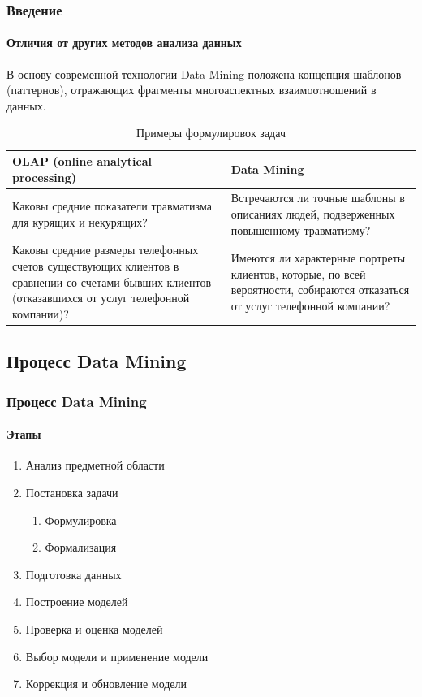 \documentclass[xcolor=table]{beamer}
\begin{document}
\begin{frame}
  \frametitle{Введение}
  \framesubtitle{Отличия от других методов анализа данных}
  В основу современной технологии Data Mining положена концепция шаблонов (паттернов), отражающих фрагменты многоаспектных взаимоотношений в данных.

  \vspace{-15pt}

  \begin{table}
    \caption{Примеры формулировок задач}
    \vspace{-10pt}
    \begin{tabular}{|p{}|p{}|}
      \hline
      \cellcolor{cell1} OLAP (online analytical processing) & \cellcolor{cell2} Data Mining \\ \hline
      \cellcolor{cell1} Каковы средние показатели травматизма для курящих и некурящих? & \cellcolor{cell2} Встречаются ли точные
      шаблоны в описаниях людей, подверженных повышенному травматизму? \\ \hline
      \cellcolor{cell1} Каковы средние размеры телефонных счетов существующих клиентов в сравнении со счетами бывших клиентов (отказавшихся от услуг телефонной компании)? &
      \cellcolor{cell2} Имеются ли характерные портреты клиентов, которые, по всей вероятности, собираются отказаться от услуг телефонной компании? \\
      \hline
    \end{tabular}
  \end{table}
\end{frame}

\subsection{Процесс Data Mining}

\begin{frame}
  \frametitle{Процесс Data Mining}
  \framesubtitle{Этапы}

  \begin{enumerate}
    \item Анализ предметной области
    \item Постановка задачи
      \begin{enumerate}
        \item Формулировка
        \item Формализация
      \end{enumerate}
    \item Подготовка данных
    \item Построение моделей
    \item Проверка и оценка моделей
    \item Выбор модели и применение модели
    \item Коррекция и обновление модели
    \end{enumerate}
\end{frame}
\end{document}
